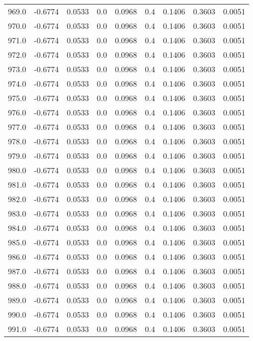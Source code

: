 \begin{longtable}{lrrrrrrrr}
969.0 & -0.6774 & 0.0533 & 0.0 & 0.0968 & 0.4 & 0.1406 & 0.3603 & 0.0051 \\
970.0 & -0.6774 & 0.0533 & 0.0 & 0.0968 & 0.4 & 0.1406 & 0.3603 & 0.0051 \\
971.0 & -0.6774 & 0.0533 & 0.0 & 0.0968 & 0.4 & 0.1406 & 0.3603 & 0.0051 \\
972.0 & -0.6774 & 0.0533 & 0.0 & 0.0968 & 0.4 & 0.1406 & 0.3603 & 0.0051 \\
973.0 & -0.6774 & 0.0533 & 0.0 & 0.0968 & 0.4 & 0.1406 & 0.3603 & 0.0051 \\
974.0 & -0.6774 & 0.0533 & 0.0 & 0.0968 & 0.4 & 0.1406 & 0.3603 & 0.0051 \\
975.0 & -0.6774 & 0.0533 & 0.0 & 0.0968 & 0.4 & 0.1406 & 0.3603 & 0.0051 \\
976.0 & -0.6774 & 0.0533 & 0.0 & 0.0968 & 0.4 & 0.1406 & 0.3603 & 0.0051 \\
977.0 & -0.6774 & 0.0533 & 0.0 & 0.0968 & 0.4 & 0.1406 & 0.3603 & 0.0051 \\
978.0 & -0.6774 & 0.0533 & 0.0 & 0.0968 & 0.4 & 0.1406 & 0.3603 & 0.0051 \\
979.0 & -0.6774 & 0.0533 & 0.0 & 0.0968 & 0.4 & 0.1406 & 0.3603 & 0.0051 \\
980.0 & -0.6774 & 0.0533 & 0.0 & 0.0968 & 0.4 & 0.1406 & 0.3603 & 0.0051 \\
981.0 & -0.6774 & 0.0533 & 0.0 & 0.0968 & 0.4 & 0.1406 & 0.3603 & 0.0051 \\
982.0 & -0.6774 & 0.0533 & 0.0 & 0.0968 & 0.4 & 0.1406 & 0.3603 & 0.0051 \\
983.0 & -0.6774 & 0.0533 & 0.0 & 0.0968 & 0.4 & 0.1406 & 0.3603 & 0.0051 \\
984.0 & -0.6774 & 0.0533 & 0.0 & 0.0968 & 0.4 & 0.1406 & 0.3603 & 0.0051 \\
985.0 & -0.6774 & 0.0533 & 0.0 & 0.0968 & 0.4 & 0.1406 & 0.3603 & 0.0051 \\
986.0 & -0.6774 & 0.0533 & 0.0 & 0.0968 & 0.4 & 0.1406 & 0.3603 & 0.0051 \\
987.0 & -0.6774 & 0.0533 & 0.0 & 0.0968 & 0.4 & 0.1406 & 0.3603 & 0.0051 \\
988.0 & -0.6774 & 0.0533 & 0.0 & 0.0968 & 0.4 & 0.1406 & 0.3603 & 0.0051 \\
989.0 & -0.6774 & 0.0533 & 0.0 & 0.0968 & 0.4 & 0.1406 & 0.3603 & 0.0051 \\
990.0 & -0.6774 & 0.0533 & 0.0 & 0.0968 & 0.4 & 0.1406 & 0.3603 & 0.0051 \\
991.0 & -0.6774 & 0.0533 & 0.0 & 0.0968 & 0.4 & 0.1406 & 0.3603 & 0.0051 \\

\end{longtable}
